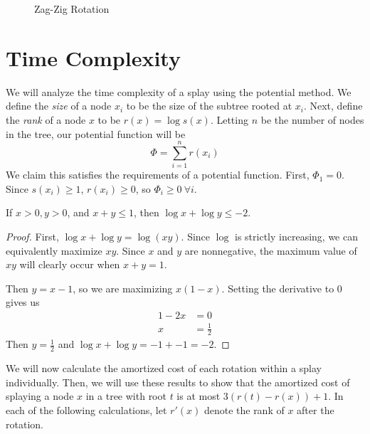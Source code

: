 \documentclass[12pt]{article}
\newcommand{\lskip}{\vspace{\baselineskip}}
\begin{document}
\begin{enumerate}
\begin{figure}[!ht]
      \caption{Zag-Zig Rotation}
    \end{figure}
\end{enumerate}

\section*{Time Complexity}
We will analyze the time complexity of a splay using the potential method. We define the \emph{size} of a node $x_i$ to be the size of the subtree rooted at $x_i$. Next, define the \emph{rank} of a node $x$ to be $r(x) = \log s(x)$. Letting $n$ be the number of nodes in the tree, our potential function will be
\[ \Phi = \sum_{i=1}^n r(x_i) \]
We claim this satisfies the requirements of a potential function. First, $\Phi_1 = 0$. Since $s(x_i) \geq 1$, $r(x_i) \geq 0$, so $\Phi_i \geq 0 \ \forall i$.
\lskip

\begin{lemma}
  If $x>0, y>0$, and $x+y \leq 1$, then $\log x + \log y \leq -2$.
\end{lemma}

\begin{proof}
  First, $\log x + \log y = \log (xy)$. Since $\log$ is strictly increasing, we can equivalently maximize $xy$. Since $x$ and $y$ are nonnegative, the maximum value of $xy$ will clearly occur when $x+y=1$.

  Then $y = x-1$, so we are maximizing $x(1-x)$. Setting the derivative to 0 gives us
  \begin{align*}
    1-2x &= 0 \\
    x &= \frac{1}{2}
  \end{align*}
  Then $y = \frac{1}{2}$ and $\log x + \log y = -1 + -1 = -2$.
\end{proof}

We will now calculate the amortized cost of each rotation within a splay individually. Then, we will use these results to show that the amortized cost of splaying a node $x$ in a tree with root $t$ is at most $3(r(t) - r(x)) + 1$. In each of the following calculations, let $r'(x)$ denote the rank of $x$ after the rotation.
\end{document}
